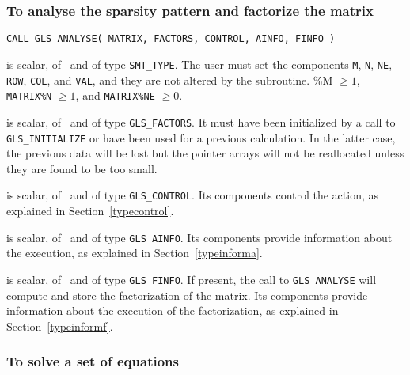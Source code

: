 \documentclass{galahad}
\newcommand{\packagename}{GLS}
\begin{document}

\subsubsection{To analyse the sparsity pattern and factorize the matrix}

\hspace{8mm}
{\tt CALL \packagename\_ANALYSE( MATRIX, FACTORS, CONTROL, AINFO, FINFO )}

\begin{description}

 is scalar, of \intentin\ and of type
{\tt SMT\_TYPE}.  The user must set the components {\tt M}, {\tt N},
{\tt NE}, {\tt ROW},
{\tt COL}, and {\tt VAL}, and they are not altered by the subroutine.
\%M $\geq 1$,
{\tt MATRIX\%N} $\geq 1$, and {\tt MATRIX\%NE} $\geq 0$.

 is scalar, of \intentinout\ and of type
{\tt \packagename\_FACTORS}. It must have been initialized by a call to
\linebreak
{\tt \packagename\_INITIALIZE} or have been used for a previous calculation.
In the latter case, the previous data will be lost but the pointer
arrays will not be reallocated unless they are found to be too small.

 is scalar, of \intentin\ and of type
{\tt \packagename\_CONTROL}. Its components control the action, as explained in
Section~\ref{typecontrol}.

 is scalar, of \intentout\ and of type {\tt \packagename\_AINFO}. Its
components provide information about the execution, as explained in
Section~\ref{typeinforma}.

 is scalar, of \intentout\ and of type
{\tt \packagename\_FINFO}.
If present, the call to {\tt \packagename\_ANALYSE} will
compute and store the
factorization of the matrix.  Its
components provide information about the execution of the
factorization, as explained in
Section~\ref{typeinformf}.

\end{description}


\subsubsection{To solve a set of equations}
\end{document}
